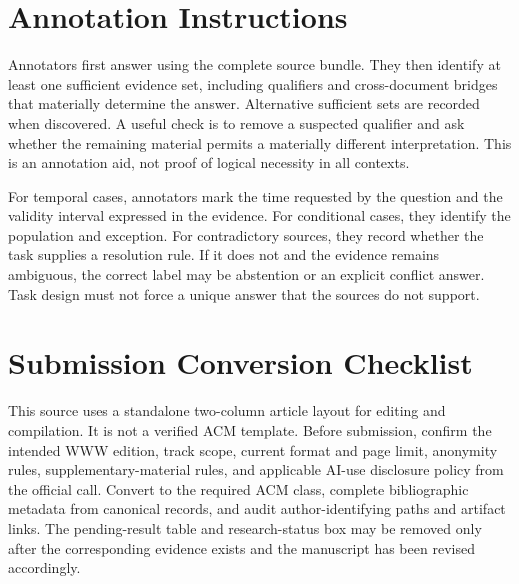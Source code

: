 \documentclass[10pt,twocolumn]{article}
\begin{document}
\section{Annotation Instructions}
Annotators first answer using the complete source bundle. They then identify at least one sufficient evidence set, including qualifiers and cross-document bridges that materially determine the answer. Alternative sufficient sets are recorded when discovered. A useful check is to remove a suspected qualifier and ask whether the remaining material permits a materially different interpretation. This is an annotation aid, not proof of logical necessity in all contexts.

For temporal cases, annotators mark the time requested by the question and the validity interval expressed in the evidence. For conditional cases, they identify the population and exception. For contradictory sources, they record whether the task supplies a resolution rule. If it does not and the evidence remains ambiguous, the correct label may be abstention or an explicit conflict answer. Task design must not force a unique answer that the sources do not support.

\section{Submission Conversion Checklist}
This source uses a standalone two-column article layout for editing and compilation. It is not a verified ACM template. Before submission, confirm the intended WWW edition, track scope, current format and page limit, anonymity rules, supplementary-material rules, and applicable AI-use disclosure policy from the official call. Convert to the required ACM class, complete bibliographic metadata from canonical records, and audit author-identifying paths and artifact links. The pending-result table and research-status box may be removed only after the corresponding evidence exists and the manuscript has been revised accordingly.
\end{document}
